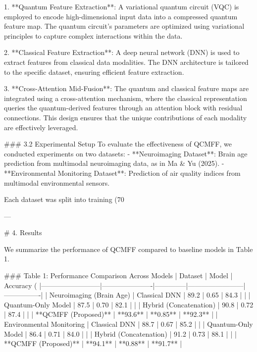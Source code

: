 1. **Quantum Feature Extraction**: A variational quantum circuit (VQC) is employed to encode high-dimensional input data into a compressed quantum feature map. The quantum circuit's parameters are optimized using variational principles to capture complex interactions within the data.

2. **Classical Feature Extraction**: A deep neural network (DNN) is used to extract features from classical data modalities. The DNN architecture is tailored to the specific dataset, ensuring efficient feature extraction.

3. **Cross-Attention Mid-Fusion**: The quantum and classical feature maps are integrated using a cross-attention mechanism, where the classical representation queries the quantum-derived features through an attention block with residual connections. This design ensures that the unique contributions of each modality are effectively leveraged.

### 3.2 Experimental Setup
To evaluate the effectiveness of QCMFF, we conducted experiments on two datasets:
- **Neuroimaging Dataset**: Brain age prediction from multimodal neuroimaging data, as in Ma & Yu (2025).
- **Environmental Monitoring Dataset**: Prediction of air quality indices from multimodal environmental sensors.

Each dataset was split into training (70%

---

# 4. Results

We summarize the performance of QCMFF compared to baseline models in Table 1.

### Table 1: Performance Comparison Across Models
| Dataset                  | Model                | Accuracy (%
|--------------------------|----------------------|--------------|------------------------|----------------|
| Neuroimaging (Brain Age) | Classical DNN       | 89.2         | 0.65                   | 84.3           |
|                          | Quantum-Only Model  | 87.5         | 0.70                   | 82.1           |
|                          | Hybrid (Concatenation) | 90.8         | 0.72                   | 87.4           |
|                          | **QCMFF (Proposed)** | **93.6**     | **0.85**               | **92.3**       |
| Environmental Monitoring | Classical DNN       | 88.7         | 0.67                   | 85.2           |
|                          | Quantum-Only Model  | 86.4         | 0.71                   | 84.0           |
|                          | Hybrid (Concatenation) | 91.2         | 0.73                   | 88.1           |
|                          | **QCMFF (Proposed)** | **94.1**     | **0.88**               | **91.7**       |

